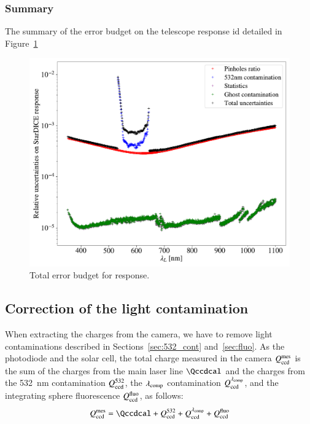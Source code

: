 \subsubsection{Summary}

The summary of the error budget on the \SD telescope response id detailed in Figure~\ref{fig:sd_budget}


\begin{figure}
    \centering
    \includegraphics[width=\columnwidth]{fig/sd_uncertainties_budget.pdf}
    \caption{Total error budget for \SD response.}
    \label{fig:sd_budget}
\end{figure}


\subsection{Correction of the light contamination}\label{sec:sd_contaminations}

When extracting the charges from the \SD camera, we have to remove light contaminations described in Sections~\ref{sec:532_cont} and~\ref{sec:fluo}. As the photodiode and the solar cell, the total charge measured in the \SD camera $Q_{\mathrm{ccd}}^{\mathrm{mes}}$ is the sum of the charges from the main laser line $\Qccdcal$ and the charges from the \SI{532}{\nm} contamination $Q_{\mathrm{ccd}}^{532}$, the $\lambda_{\rm comp}$ contamination $Q_{\mathrm{ccd}}^{\lambda_{\rm comp}}$, and the integrating sphere fluorescence $Q_{\mathrm{ccd}}^{\mathrm{fluo}}$, as follows:
\begin{equation}
    \Qccdmes = \Qccdcal + \Qccd^{532} + \Qccd^{\lambda_{\rm comp}} + \Qccd^{\mathrm{fluo}}
    \label{eq:qccd_mes}
\end{equation}

